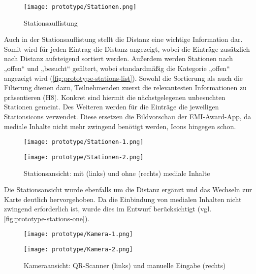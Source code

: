 
\begin{figure}[htpb]
    \centering
    \texttt{[image: prototype/Stationen.png]}
    \caption{Stationsauflistung}
    \label{fig:prototype-stations-list}
\end{figure}

Auch in der Stationsauflistung stellt die Distanz eine wichtige Information dar.
Somit wird für jeden Eintrag die Distanz angezeigt, wobei die Einträge
zusätzlich nach Distanz aufsteigend sortiert werden. Außerdem werden Stationen
nach „offen“ und „besucht“ gefiltert, wobei standardmäßig die Kategorie „offen“
angezeigt wird (\autoref{fig:prototype-stations-list}). Sowohl die Sortierung als auch die Filterung dienen dazu,
Teilnehmenden zuerst die relevantesten Informationen zu präsentieren (H8).
Konkret sind hiermit die nächstgelegenen unbesuchten Stationen gemeint. Des
Weiteren werden für die Einträge die jeweiligen Stationsicons verwendet. Diese
ersetzen die Bildvorschau der EMI-Award-App, da mediale Inhalte nicht mehr
zwingend benötigt werden, Icons hingegen schon.

\begin{figure}[htpb]
    \begin{minipage}{.5\textwidth}
        \centering
        \texttt{[image: prototype/Stationen-1.png]}
    \end{minipage}%
    \begin{minipage}{.5\textwidth}
        \centering
        \texttt{[image: prototype/Stationen-2.png]}
    \end{minipage}
    \caption{Stationsansicht: mit (links) und ohne (rechts) mediale Inhalte}
    \label{fig:prototype-stations-one}
\end{figure}

Die Stationsansicht wurde ebenfalls um die Distanz ergänzt und das
Wechseln zur Karte deutlich hervorgehoben. Da die Einbindung von medialen
Inhalten nicht zwingend erforderlich ist, wurde dies im Entwurf berücksichtigt
(vgl. \autoref{fig:prototype-stations-one}).

\begin{figure}[htpb]
    \begin{minipage}{.5\textwidth}
        \centering
        \texttt{[image: prototype/Kamera-1.png]}
    \end{minipage}%
    \begin{minipage}{.5\textwidth}
        \centering
        \texttt{[image: prototype/Kamera-2.png]}
    \end{minipage}
    \caption{Kameraansicht: QR-Scanner (links) und manuelle Eingabe (rechts)}
    \label{fig:prototype-camera}
\end{figure}

